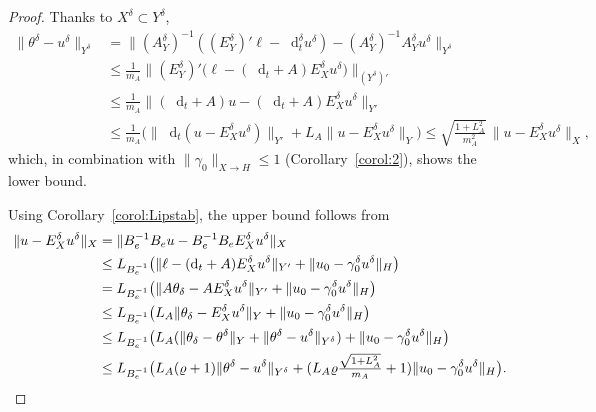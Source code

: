 \documentclass{amsart}
\numberwithin{equation}{section}
\newcommand{\1}{\mathbb 1}
\newcommand*\diff{\mathop{}\!\mathrm{d}}
\begin{document}
\begin{proof} Thanks to $X^\delta \subset Y^\delta$,
\begin{align*}
\|\theta^\delta- u^\delta\|_{Y^\delta}&=\|(A_Y^\delta)^{-1} ((E_Y^\delta)'\ell -\diff_t^\delta u^\delta)-(A_Y^\delta)^{-1} A_Y^\delta u^\delta\|_{Y^\delta}\\
&\leq \tfrac{1}{m_A} \|(E_Y^\delta)'\big(\ell -(\diff_t + A) E_X^\delta u^\delta\big)\|_{(Y^\delta)'}\\
&\leq \tfrac{1}{m_A} \|(\diff_t + A)u -(\diff_t + A) E_X^\delta u^\delta\|_{Y'}\\
& \leq \tfrac{1}{m_A}\big(\|\diff_t(u- E_X^\delta u^\delta)\|_{Y'}+ L_A\|u-E_X^\delta u^\delta\|_Y\big) \leq \sqrt{\tfrac{1+L_A^2}{m_A^2}}\, \|u-E_X^\delta  u^\delta\|_X,
\end{align*}
which, in combination with $\|\gamma_0\|_{X \rightarrow H} \leq 1$ (Corollary~\ref{corol:2}), shows the lower bound.

Using Corollary~\ref{corol:Lipstab}, the upper bound follows from
\begin{align*}
\|u-E_X^\delta u^\delta\|_X&=\|B_e^{-1} B_e u-B_e^{-1} B_e E_X^\delta u^\delta\|_X \\
&\leq L_{B_e^{-1}} \big(\|\ell - (\diff_t+A) E_X^\delta u^\delta\|_{Y'}+\|u_0 -\gamma^\delta_0 u^\delta\|_H\big)
\\ & = L_{B_e^{-1}} \big(\|A \theta_\delta - A E_X^\delta u^\delta\|_{Y'}+\|u_0 -\gamma^\delta_0 u^\delta\|_H\big)
\\ & \leq L_{B_e^{-1}} \big(L_A \|\theta_\delta - E_X^\delta u^\delta\|_{Y}+\|u_0 -\gamma^\delta_0 u^\delta\|_H\big)
\\ & \leq L_{B_e^{-1}} \big(L_A (\|\theta_\delta - \theta^\delta\|_{Y}+\|\theta^\delta - u^\delta\|_{Y^\delta})+\|u_0 -\gamma^\delta_0 u^\delta\|_H\big)
\\ & \leq L_{B_e^{-1}} \big(L_A (\varrho+1) \|\theta^\delta-u^\delta\|_{Y^\delta}+(L_A \varrho \tfrac{\sqrt{1+L_A^2}}{m_A}+1) \|u_0 -\gamma^\delta_0 u^\delta\|_H\big).\qedhere
\end{align*}
\end{proof}

\end{document}
